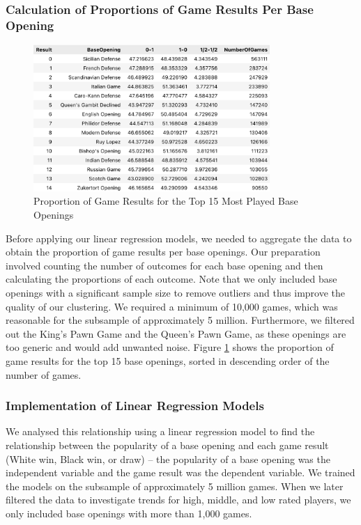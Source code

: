 \documentclass[a4paper, 11pt]{article}
\begin{document}
\subsubsection{Calculation of Proportions of Game Results Per Base Opening}

\begin{figure}[H]
    \centering
    \caption{Proportion of Game Results for the Top 15 Most Played Base Openings}
    \label{fig:proportionOfGameResultsForTop15BaseOpenings}
    \includegraphics[width=0.8\textwidth]{Proportion of Game Results for Top 15 Base Openings.png}
\end{figure}

Before applying our linear regression models, we needed to aggregate the data to obtain the proportion of game results per base openings. Our preparation involved counting the number of outcomes for each base opening and then calculating the proportions of each outcome. Note that we only included base openings with a significant sample size to remove outliers and thus improve the quality of our clustering. We required a minimum of 10,000 games, which was reasonable for the subsample of approximately 5 million. Furthermore, we filtered out the King's Pawn Game and the Queen's Pawn Game, as these openings are too generic and would add unwanted noise. Figure \ref{fig:proportionOfGameResultsForTop15BaseOpenings} shows the proportion of game results for the top 15 base openings, sorted in descending order of the number of games.

\subsubsection{Implementation of Linear Regression Models}
We analysed this relationship using a linear regression model to find the relationship between the popularity of a base opening and each game result (White win, Black win, or draw) -- the popularity of a base opening was the independent variable and the game result was the dependent variable. We trained the models on the subsample of approximately 5 million games. When we later filtered the data to investigate trends for high, middle, and low rated players, we only included base openings with more than 1,000 games.
\end{document}
